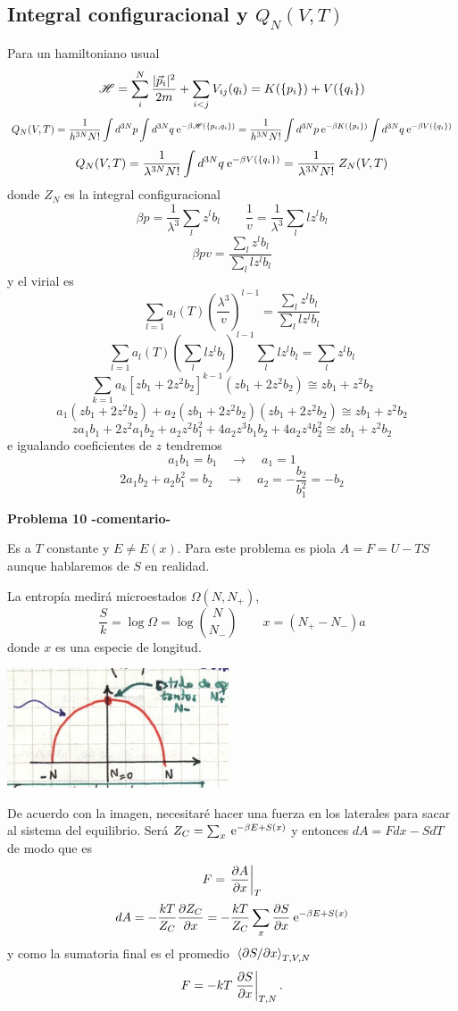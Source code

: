 \documentclass[10pt,oneside]{CBFT_book}
\begin{document}
\subsection{Integral configuracional y $Q_N(V,T)$}

Para un hamiltoniano usual
\[
	\mathscr{H} = \sum_i^N \frac{|\vec{p}_i|^2}{2m} + \sum_{i<j} V_{ij}(q_i) = K(\{ p_i \}) + V(\{ q_i \})
\]
\[
	Q_N(V,T) = \frac{1}{h^{3N}N!}\int d^{3N}p \int d^{3N}q \:\mathrm{e}^{-\beta \mathscr{H}(\{ p_i,q_i \})} =
	\frac{1}{h^{3N}N!}\int d^{3N}p \:\mathrm{e}^{-\beta K(\{ p_i \})}  \int d^{3N}q \:\mathrm{e}^{-\beta V(\{ q_i \}) } 
\]
\[
	Q_N(V,T) = \frac{1}{\lambda^{3N}N!} \int d^{3N}q \:\mathrm{e}^{-\beta V(\{ q_i \}) }  =
	\frac{1}{\lambda^{3N}N!} \: Z_N(V,T)
\]
donde $Z_N$ es la integral configuracional
\[
	\beta p = \frac{1}{\lambda^3} \sum_l z^l b_l  \qquad \frac{1}{v} = \frac{1}{\lambda^3} \sum_l lz^l b_l 
\]
\[
	\beta p v = \frac{ \sum_l z^l b_l }{ \sum_l l z^l b_l  }
\]
y el virial es 
\[
	\sum_{l=1} a_l(T) \left( \frac{\lambda^3}{v} \right)^{l-1} = \frac{ \sum_l z^l b_l }{ \sum_l l z^l b_l  }
\]
\[
	\sum_{l=1} a_l(T) \left( \sum_l l z^l b_l \right)^{l-1} \sum_l l z^l b_l = \sum_l z^l b_l 
\]
\[
	\sum_{k=1} a_k [ zb_1 + 2z^2b_2 ]^{k-1} (zb_1+2z^2b_2) \cong zb_1 + z^2b_2
\]
\[
	a_1(zb_1+2z^2b_2) + a_2(zb_1+2z^2b_2) (zb_1+2z^2b_2) \cong zb_1 + z^2b_2
\]
\[
	za_1b_1 + 2z^2a_1b_2 + a_2z^2b_1^2 + 4a_2z^3b_1b_2 + 4 a_2 z^4 b_2^2 \cong zb_1 + z^2b_2
\]
e igualando coeficientes de $ z $ tendremos 
\[
 	a_1b_1 = b_1 \quad \rightarrow \quad a_1 = 1
\]
\[
	2a_1b_2 + a_2b_1^2 = b_2  \quad \rightarrow \quad  a_2 = -\frac{b_2}{b_1^2} = -b_2
\]

\begin{ejemplo}{\bf Problema 10 -comentario-}

Es a $T$ constante y $E\neq E(x)$. Para este problema es piola $ A = F = U - TS $ aunque
hablaremos de $S$ en realidad.

La entropía medirá microestados $\Omega(N,N_+)$,
\[
	\frac{S}{k} = \log \Omega = \log \binom{N}{N_-} \qquad 
	x = (N_+ - N_-) a
\]
donde $x$ es una especie de longitud.
 
\includegraphics[scale=0.5]{images/1606329480.jpg} 

De acuerdo con la imagen, necesitaré hacer una fuerza en los laterales para sacar al sistema
del equilibrio.
Será $ Z_C = \sum_x \:\mathrm{e}^{-\beta E + S(x)}$ y entonces $dA = F dx - S dT$ de modo que es
\[
	F = \left.\frac{\partial^{\hspace{-0.05em}} {A}}{\partial {x}^{\hspace{-0.05em}}}\right|_{T}
\]
\[
	dA = - \frac{kT}{Z_C} \frac{\partial^{\hspace{-0.05em}} {Z_C}}{\partial {x}^{\hspace{-0.05em}}} = - \frac{kT}{Z_C} \sum_ x \frac{\partial^{\hspace{-0.05em}} {S}}{\partial {x}^{\hspace{-0.05em}}} \:\mathrm{e}^{-\beta E + S(x)}
\]
y como la sumatoria final es el promedio $\:\left\langle \partial S/\partial x \right\rangle_{T,V,N}$
\[
	F = - k T \left.\frac{\partial^{\hspace{-0.05em}} {S}}{\partial {x}^{\hspace{-0.05em}}}\right|_{T,N}.
\]
 
\end{ejemplo}
\end{document}
